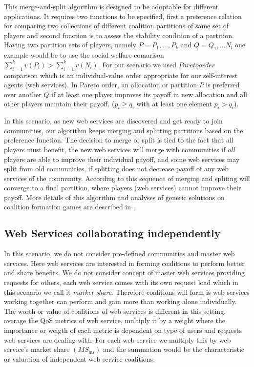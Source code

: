 \documentclass[10pt, conference, compsocconf]{IEEEtran}
\theoremstyle{plain}
\theoremstyle{definition}
\begin{document}
This merge-and-split algorithm is designed to be adoptable for different applications. It requires two functions to be specified, first a preference relation for comparing two collections of different coalition partitions of same set of players and second function is to assess the stability condition of a partition. Having two partition sets of players, namely $P = {P_1,...,P_k}$ and $Q = {Q_1,...N_l}$ one example would be to use the social welfare comarison $\sum^k_{i=1}v(P_i) > \sum^k_{i=1}v(N_l)$. For our scenario we used $Pareto order$ comparison which is an individual-value order appropriate for our self-interest agents (web services). In Pareto order, an allocation or partition $P$ is preferred over another $Q$ if at least one player improves its payoff in new allocation and all other players maintain their payoff. ($p_i \geq q_i$ with at least one element $p_i > q_i$).

In this scenario, as new web services are discovered and get ready to join communities, our algorithm keeps merging and splitting partitions based on the preference function. The decision to merge or split is tied to the fact that all players must benefit, the new web services will merge with communities if $all$ players are able to improve their individual payoff, and some web services may split from old communities, if splitting does not decrease payoff of any web services of the community. According to \cite{DBLP:journals/corr/abs-cs-0605132} this sequence of merging and spliting will converge to a final partition, where players (web services) cannot improve their payoff. More details of this algorithm and analyses of generic solutions on coalition formation games are described in \cite{DBLP:journals/igtr/AptW09}.

\subsection {Web Services collaborating independently}

In this scenario, we do not consider pre-defined communities and master web services. Here web services are interested in forming coalitions to perform better and share benefits. We do not consider concept of master web services providing requests for others, each web service comes with its own request load which in this scenario we call it \emph{market share}. Therefore coalitions will form is web services working together can perform and gain more than working alone individually. The worth or value of coalitions of web services is different in this setting, average the QoS metrics of web service, multiply it by a weight where the importance or weigth of each metric is dependent on type of users and requests web services are dealing with. For each web service we multiply this by web service's market share $(MS_{ws})$ and the summation would be the characteristic or valuation of independent web service coalitions.
\end{document}
